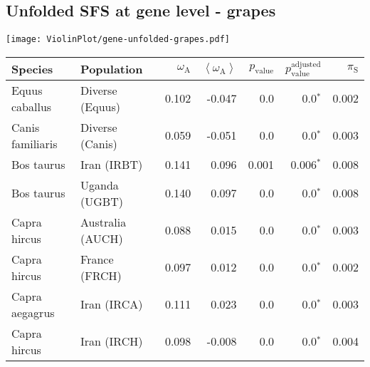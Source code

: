 \newpage
\subsection{Unfolded SFS at gene level - grapes} 
\begin{center}
\texttt{[image: ViolinPlot/gene-unfolded-grapes.pdf]} 
\begin{adjustbox}{width = 1\textwidth}
\begin{tabular}{|l|l|r|r|r|r|r|}
\toprule
             Species &                      Population & $\omega_{\mathrm{A}}$ & $\left< \omega_{\mathrm{A}} \right>$ & $p_{\mathrm{value}}$ & $p_{\mathrm{value}}^{\mathrm{adjusted}}$ & $\pi_{\textrm{S}}$ \\
\midrule
      Equus caballus &                 Diverse (Equus) &                 0.102 &                               -0.047 &                  0.0 &                             0.0$\bm{^*}$ &              0.002 \\
    Canis familiaris &                 Diverse (Canis) &                 0.059 &                               -0.051 &                  0.0 &                             0.0$\bm{^*}$ &              0.003 \\
          Bos taurus &                     Iran (IRBT) &                 0.141 &                                0.096 &                0.001 &                           0.006$\bm{^*}$ &              0.008 \\
          Bos taurus &                   Uganda (UGBT) &                 0.140 &                                0.097 &                  0.0 &                             0.0$\bm{^*}$ &              0.008 \\
        Capra hircus &                Australia (AUCH) &                 0.088 &                                0.015 &                  0.0 &                             0.0$\bm{^*}$ &              0.003 \\
        Capra hircus &                   France (FRCH) &                 0.097 &                                0.012 &                  0.0 &                             0.0$\bm{^*}$ &              0.002 \\
      Capra aegagrus &                     Iran (IRCA) &                 0.111 &                                0.023 &                  0.0 &                             0.0$\bm{^*}$ &              0.003 \\
        Capra hircus &                     Iran (IRCH) &                 0.098 &                               -0.008 &                  0.0 &                             0.0$\bm{^*}$ &              0.004 \\

\end{tabular}
\end{adjustbox}
\end{center}
